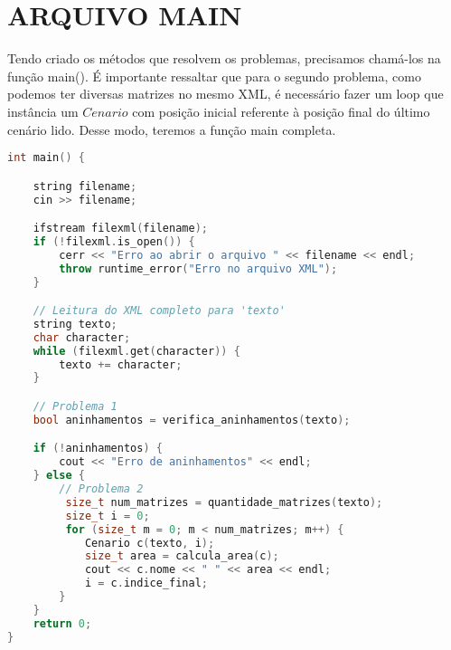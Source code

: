 \section{ARQUIVO MAIN}

Tendo criado os métodos que resolvem os problemas, precisamos chamá-los na função main(). É importante ressaltar que para o segundo problema, como podemos ter diversas matrizes no mesmo XML, é necessário fazer um loop que instância um $Cenario$ com posição inicial referente à posição final do último cenário lido. Desse modo, teremos a função main completa.

\begin{lstlisting}[language=c++]
int main() {

    string filename;
    cin >> filename;

    ifstream filexml(filename);
    if (!filexml.is_open()) {
        cerr << "Erro ao abrir o arquivo " << filename << endl;
        throw runtime_error("Erro no arquivo XML");
    }

    // Leitura do XML completo para 'texto'
    string texto;
    char character;
    while (filexml.get(character)) {
        texto += character;
    }

    // Problema 1
    bool aninhamentos = verifica_aninhamentos(texto);

    if (!aninhamentos) {
        cout << "Erro de aninhamentos" << endl;
    } else {
        // Problema 2
         size_t num_matrizes = quantidade_matrizes(texto);
         size_t i = 0;
         for (size_t m = 0; m < num_matrizes; m++) {
            Cenario c(texto, i); 
            size_t area = calcula_area(c);
            cout << c.nome << " " << area << endl;
            i = c.indice_final;
        }
    }
    return 0;
}
\end{lstlisting}